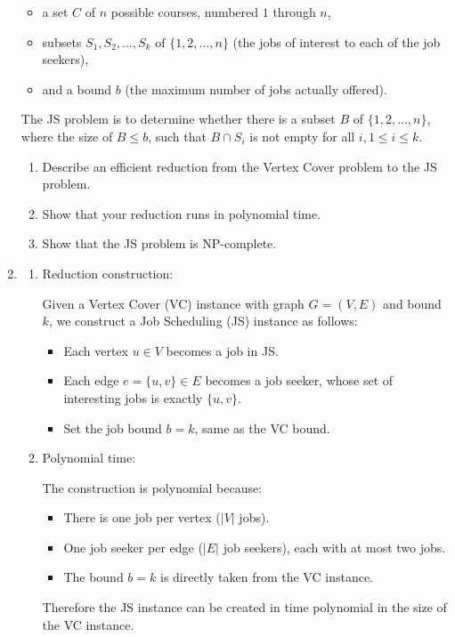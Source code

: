 \documentclass[12pt,a4paper]{article}
\makeatletter
\newtheorem*{solution}{Solution}
\theoremstyle{definition}
\renewenvironment{solution}[1][Solution] {\par\pushQED{\qed}\normalfont\topsep6\p@\@plus6\p@\relax\trivlist\item[\hskip\labelsep\bfseries#1\@addpunct{.}]\ignorespaces}{\popQED\endtrivlist\@endpefalse} \makeatother
\makeatother
\begin{document}
\begin{enumerate}
    \begin{itemize}
        \item a set $C$ of $n$ possible courses, numbered $1$ through $n$, 
        
        \item subsets $S_1, S_2, \dots, S_k \text{ of } \{1, 2, \dots, n\}$ (the jobs of interest to each of the job seekers), 
        
        \item and a bound $b$ (the maximum number of jobs actually offered).
    \end{itemize}

    The JS problem is to determine whether there is a subset $B$ of $\{1, 2, \dots, n\}$, where the size of $B \leq b$, such that $B \cap S_i$ is not empty for all $i, 1 \leq i \leq k$.

    \begin{enumerate}
        \item Describe an efficient reduction from the Vertex Cover problem to the JS problem.
        
        \item Show that your reduction runs in polynomial time.
        
        \item Show that the JS problem is NP-complete.
    \end{enumerate}


    \begin{solution}
        
    \begin{enumerate}
    \item Reduction construction:

    Given a Vertex Cover (VC) instance with graph \(G=(V,E)\) and bound \(k\), we construct a Job Scheduling (JS) instance as follows:
    \begin{itemize}
        \item Each vertex \(u \in V\) becomes a job in JS.
        \item Each edge \(e = \{u,v\} \in E\) becomes a job seeker, whose set of interesting jobs is exactly \(\{u,v\}\).
        \item Set the job bound \(b = k\), same as the VC bound.
    \end{itemize}

    \item Polynomial time:

    The construction is polynomial because:
    \begin{itemize}
        \item There is one job per vertex (\(|V|\) jobs).
        \item One job seeker per edge (\(|E|\) job seekers), each with at most two jobs.
        \item The bound \(b=k\) is directly taken from the VC instance.
    \end{itemize}
    Therefore the JS instance can be created in time polynomial in the size of the VC instance.


\end{enumerate}
\end{solution}
\end{enumerate}
\end{document}
